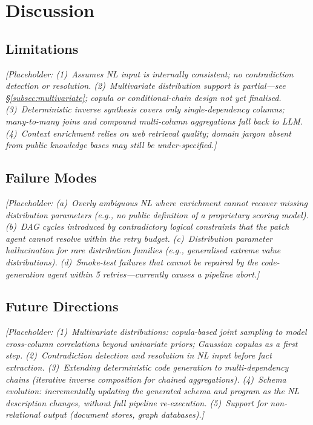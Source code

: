 \section{Discussion}

\subsection{Limitations}
\textit{[Placeholder: (1)~Assumes NL input is internally consistent; no contradiction
detection or resolution.
(2)~Multivariate distribution support is partial---see \S\ref{subsec:multivariate};
copula or conditional-chain design not yet finalised.
(3)~Deterministic inverse synthesis covers only single-dependency columns;
many-to-many joins and compound multi-column aggregations fall back to LLM.
(4)~Context enrichment relies on web retrieval quality; domain jargon absent from
public knowledge bases may still be under-specified.]}

\subsection{Failure Modes}
\textit{[Placeholder: (a)~Overly ambiguous NL where enrichment cannot recover missing
distribution parameters (e.g., no public definition of a proprietary scoring model).
(b)~DAG cycles introduced by contradictory logical constraints that the patch agent
cannot resolve within the retry budget.
(c)~Distribution parameter hallucination for rare distribution families
(e.g., generalised extreme value distributions).
(d)~Smoke-test failures that cannot be repaired by the code-generation agent
within 5 retries---currently causes a pipeline abort.]}

\subsection{Future Directions}
\textit{[Placeholder: (1)~Multivariate distributions: copula-based joint sampling to model
cross-column correlations beyond univariate priors; Gaussian copulas as a first step.
(2)~Contradiction detection and resolution in NL input before fact extraction.
(3)~Extending deterministic code generation to multi-dependency chains
(iterative inverse composition for chained aggregations).
(4)~Schema evolution: incrementally updating the generated schema and program as the
NL description changes, without full pipeline re-execution.
(5)~Support for non-relational output (document stores, graph databases).]}

